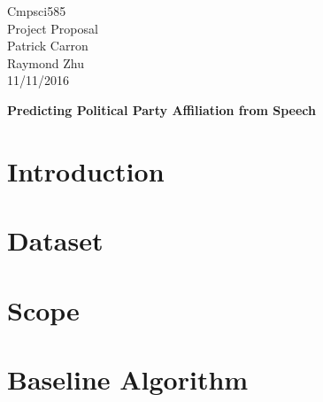 \documentclass[a4paper, 11pt]{article}
\begin{document}
\noindent
Cmpsci585\\
Project Proposal\\
Patrick Carron \\
Raymond Zhu\\
11/11/2016 \\
\begin{center}

\textbf{Predicting Political Party Affiliation from Speech}
\end{center}
\section{Introduction}

\section{Dataset}

\section{Scope}

\section{Baseline Algorithm}
\end{document}
